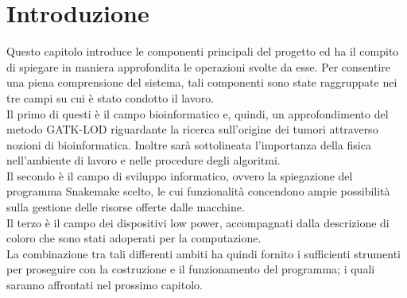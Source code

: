 \chapter{Introduzione}
Questo capitolo introduce le componenti principali del progetto ed ha il compito di spiegare in maniera approfondita le operazioni svolte da esse. Per consentire una piena comprensione del sistema, tali componenti sono state raggruppate nei tre campi su cui è stato condotto il lavoro.\\
Il primo di questi è il campo bioinformatico e, quindi, un approfondimento del metodo GATK-LOD riguardante la ricerca sull'origine dei tumori attraverso nozioni di bioinformatica. Inoltre sarà sottolineata l'importanza della fisica nell'ambiente di lavoro e nelle procedure degli algoritmi.\\
Il secondo è il campo di sviluppo informatico, ovvero la spiegazione del programma Snakemake scelto, le cui funzionalità concendono ampie possibilità sulla gestione delle risorse offerte dalle macchine.\\
Il terzo è il campo dei dispositivi low power, accompagnati dalla descrizione di coloro che sono stati adoperati per la computazione.\\   
La combinazione tra tali differenti ambiti ha quindi fornito i sufficienti strumenti per proseguire con la costruzione e il funzionamento del programma; i quali saranno affrontati nel prossimo capitolo. \\ 

